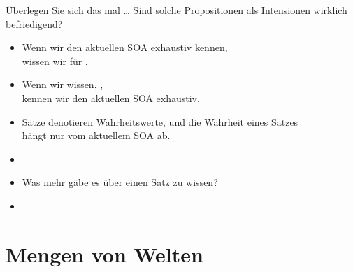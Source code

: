 \begin{frame}
  {Überlegen Sie sich das mal \ldots}
  \onslide<+->
  Sind solche Propositionen als Intensionen wirklich befriedigend?\\
  \Halbzeile
  \begin{itemize}[<+->]
    \item Wenn wir den \alert{aktuellen SOA exhaustiv} kennen,\\
      wissen wir für .
      \Halbzeile
    \item Wenn wir wissen, ,\\
      kennen wir den \alert{aktuellen SOA exhaustiv}.
      \Halbzeile
    \item Sätze denotieren Wahrheitswerte, und die Wahrheit eines Satzes\\
      hängt nur vom aktuellem SOA ab.
      \Viertelzeile
    \item[ ] \\
      \Viertelzeile
    \item Was mehr gäbe es über einen Satz zu wissen?
    \item {}
  \end{itemize}
\end{frame}


\section{Mengen von Welten}

